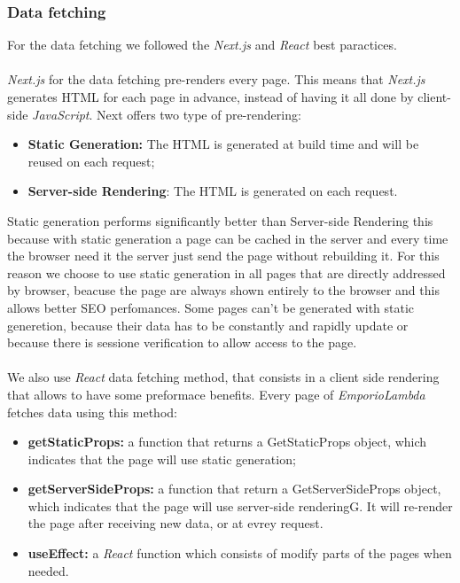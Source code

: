 \subsubsection{Data fetching}
For the data fetching we followed the \textit{Next.js} and \textit{React} best paractices.
\\
\\
\textit{Next.js} for the data fetching pre-renders every page. This means that \textit{Next.js} generates HTML for each page in advance, instead of having it all done by client-side \textit{JavaScript}. Next offers two type of pre-rendering:
\begin{itemize}
  \item \textbf{Static Generation:} The HTML is generated at build time and will be reused on each request;
  \item \textbf{Server-side Rendering}: The HTML is generated on each request.
\end{itemize}
Static generation performs significantly better than Server-side Rendering this because with static generation a page can be cached in the server and every time the browser need it the server just send the page without rebuilding it. For this reason we choose to use static generation in all pages that are directly addressed by browser, beacuse the page are always shown entirely to the browser and this allows better SEO perfomances. Some pages can't be generated with static generetion, because their data has to be constantly and rapidly update or because there is sessione verification to allow access to the page.
\\
\\
We also use \textit{React} data fetching method, that consists in a client side rendering that allows to have some preformace benefits.
Every page of \textit{EmporioLambda} fetches data using this method:
\begin{itemize}
  \item \textbf{getStaticProps:} a function that returns a GetStaticProps object, which indicates that the page will use static generation;
  \item \textbf{getServerSideProps:} a function that return a GetServerSideProps object, which indicates that the page will use server-side renderingG. It will  re-render the page after receiving new data, or at evrey request.
  \item \textbf{useEffect:} a \textit{React} function which consists of modify parts of the pages when needed.
\end{itemize}
